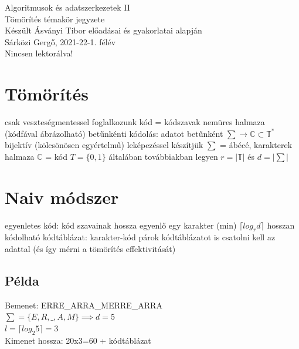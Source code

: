 \documentclass[12pt,a4paper]{article}
\begin{document}
\begin{center}
	\huge
	Algoritmusok és adatszerkezetek II\\
	\vspace{1mm}
	\LARGE
	Tömörítés témakör jegyzete\\
	\vspace{5mm}
	\large
	Készült Ásványi Tibor előadásai és gyakorlatai alapján\\
	\vspace{5mm}
	Sárközi Gergő, 2021-22-1. félév\\
	Nincsen lektorálva!
\end{center}

\tableofcontents

\pagebreak

\section{Tömörítés}

\begin{outline}
	\1 csak veszteségmentessel foglalkozunk
	\1 kód = kódszavak nemüres halmaza (kódfával ábrázolható)
	\1 betűnkénti kódolás: adatot betűnként
	$ \sum \to \mathbb{C} \subset \mathbb{T}^* $
	bijektív (kölcsönösen egyértelmű) leképezéssel készítjük
		\2 $ \sum $ = ábécé, karakterek halmaza
		\2 $ \mathbb{C} $ = kód
		\2 $ T=\{0,1\} $ általában
		\2 továbbiakban legyen $ r=|\mathbb{T}| $ és $ d=|\sum| $
\end{outline}

\pagebreak

\section{Naiv módszer}

\begin{outline}
	\1 egyenletes kód: kód szavainak hossza egyenlő
	\1 egy karakter (min) $ \lceil log_r d \rceil $ hosszan kódolható
	\1 kódtáblázat: karakter-kód párok
	\1 kódtáblázatot is csatolni kell az adattal
	(és így mérni a tömörítés effektivitását)
\end{outline}

\subsection{Példa}

Bemenet: ERRE\_ARRA\_MERRE\_ARRA \\
$ \sum = \{ E, R, \_, A, M \} \implies d=5 $  \\
$ l=\lceil log_2 5 \rceil=3 $ \\
Kimenet hossza: 20x3=60 + kódtáblázat
\end{document}
